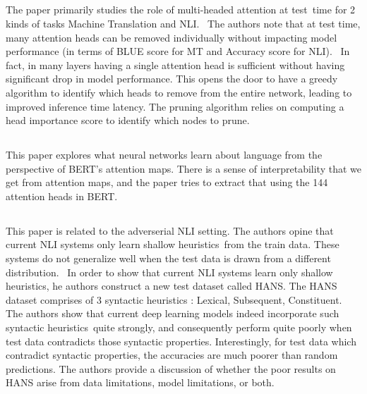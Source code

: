\subsection{\cite{michel2019sixteen}}
\label{subsec:michel2019sixteen}

The paper primarily studies the role of multi-headed attention at test time for 2 kinds of tasks Machine Translation and NLI.  The authors note that at test time, many attention heads can be removed individually without impacting model performance (in terms of BLUE score for MT and Accuracy score for NLI).  In fact, in many layers having a single attention head is sufficient without having significant drop in model performance. This opens the door to have a greedy algorithm to identify which heads to remove from the entire network, leading to improved inference time latency. The pruning algorithm relies on computing a head importance score to identify which nodes to prune.

\subsection{\cite{clark2019does}}
\label{subsec:clark2019does}

This paper explores what neural networks learn about language from the perspective of BERT's attention maps. There is a sense of interpretability that we get from attention maps, and the paper tries to extract that using the 144 attention heads in BERT. 

\subsection{\cite{mccoy2019right}}
\label{subsec:mccoy2019right}

This paper is related to the adverserial NLI setting. The authors opine that current NLI systems only learn shallow heuristics from the train data. These systems do not generalize well when the test data is drawn from a different distribution.  In order to show that current NLI systems learn only shallow heuristics, he authors construct a new test dataset called HANS. The HANS dataset comprises of 3 syntactic heuristics : {Lexical, Subsequent, Constituent}. The authors show that current deep learning models indeed incorporate such syntactic heuristics quite strongly, and consequently perform quite poorly when test data contradicts those syntactic properties. Interestingly, for test data which contradict syntactic properties, the accuracies are much poorer than random predictions. The authors provide a discussion of whether the poor results on HANS arise from data limitations, model limitations, or both.